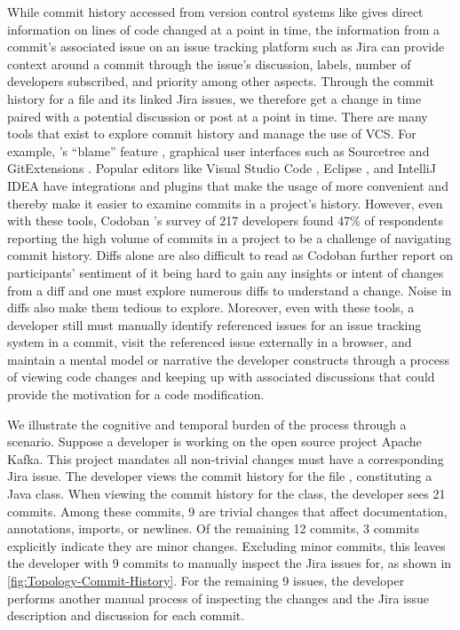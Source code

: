 While commit history accessed from version control systems like  gives direct information on lines of code changed at a point in time, the information from a commit's associated issue on an issue tracking platform such as Jira \cite{jira} can provide context around a commit through the issue's discussion, labels, number of developers subscribed, and priority among other aspects.
Through the commit history for a file and its linked Jira issues, we therefore get a change in time paired with a potential discussion or post at a point in time.
There are many tools that exist to explore commit history and manage the use of VCS. For example, 's ``blame'' feature \cite{gitblame}, graphical user interfaces such as Sourcetree \cite{sourcetree} and GitExtensions \cite{gitextensions}. 
Popular editors like Visual Studio Code \cite{vscode}, Eclipse \cite{eclipse}, and IntelliJ IDEA \cite{intellij} have  integrations and plugins that make the usage of  more convenient and thereby make it easier to examine commits in a project's history. 
However, even with these tools, Codoban \etal's \cite{codoban_software_2015} survey of 217 developers found 47\% of respondents reporting the high volume of commits in a project to be a challenge of navigating commit history. 
Diffs alone are also difficult to read as Codoban \etal \cite{codoban_software_2015} further report on participants' sentiment of it being hard to gain any insights or intent of changes from a diff and one must explore numerous diffs to understand a change. Noise in diffs also make them tedious to explore. 
Moreover, even with these tools, a developer still must manually identify referenced issues for an issue tracking system in a commit, visit the referenced issue externally in a browser, and maintain a mental model or narrative the developer constructs through a process of viewing code changes and keeping up with associated discussions that could provide the motivation for a code modification. 

We illustrate the cognitive and temporal burden of the process through a scenario.
Suppose a developer is working on the open source project Apache Kafka. 
This project mandates all non-trivial changes must have a corresponding Jira issue. 
The developer views the commit history for the file , constituting a Java class. 
When viewing the commit history for the  class, the developer sees 21 commits.
Among these commits, 9 are trivial changes that affect documentation, annotations, imports, or newlines. 
Of the remaining 12 commits, 3 commits explicitly indicate they are minor changes.
Excluding minor commits, this leaves the developer with 9 commits to manually inspect the Jira issues for, as shown in \autoref{fig:Topology-Commit-History}.
For the remaining 9 issues, the developer performs another manual process of inspecting the changes and the Jira issue description and discussion for each commit.

